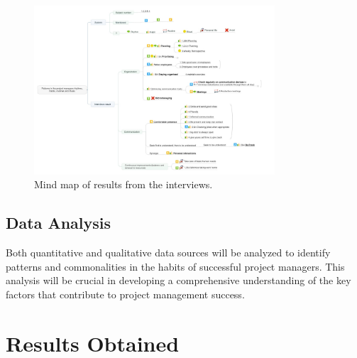 \documentclass{article}
\begin{document}
\begin{figure}[h]
    \centering
    \includegraphics[width=0.8\textwidth]{image3.png}\par
    \caption{Mind map of results from the interviews\cite{Patterns}.}
    \label{fig:mesh1}
\end{figure}




\subsection{Data Analysis}
Both quantitative and qualitative data sources will be analyzed to identify patterns and commonalities in the habits of successful project managers. This analysis will be crucial in developing a comprehensive understanding of the key factors that contribute to project management success.


\section{Results Obtained}
\end{document}

